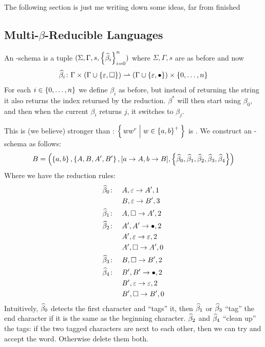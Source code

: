 \documentclass{llncs}
\newcommand{\ari}[1]{{\begin{mdframed}[linecolor=blue]{\color{blue}#1}\end{mdframed}}}
\begin{document}
\ari{The following section is just me writing down some ideas, far from finished}

\subsection{Multi-$\beta$-Reducible Languages}

An \MBR-schema is a tuple $(\Sigma,\Gamma,s,\set{\hb_i}_{i=0}^n)$ where $\Sigma,\Gamma,s$ are as before and now
\[ \hb_i\colon\Gamma\times(\Gamma\cup\set{\epsilon,\square})\partial(\Gamma\cup\set{\epsilon,\bullet})\times\set{0,\dots,n} \]
For each $i\in\set{0,\dots,n}$ we define $\beta_i$ as before, but instead of returning the string it also returns the index returned by the reduction.
$\beta^*$ will then start using $\beta_0$, and then when the current $\beta_i$ returns $j$, it switches to $\beta_j$.

This is (we believe) stronger than \BR: $\set{ww^r}[w\in\set{a,b}^+]$ is \MBR.
We construct an \MBR-schema as follows:
\[ B = \parens{\set{a,b},\set{A,B,A',B'},[a\to A,b\to B],\set{\hb_0,\hb_1,\hb_2,\hb_3,\hb_4}} \]
Where we have the reduction rules:
\begin{align*}
    \widehat\beta_0\colon\quad& A,\varepsilon\to A',1\\
        & B,\varepsilon\to B',3\\
    \widehat\beta_1\colon\quad& A,\square\to A',2\\
    \widehat\beta_2\colon\quad& A',A'\to\bullet,2\\
        &A',\varepsilon\to\varepsilon,2\\
        &A',\square\to A',0\\
    \widehat\beta_3\colon\quad& B,\square\to B',2\\
    \widehat\beta_4\colon\quad& B',B'\to\bullet,2\\
        &B',\varepsilon\to\varepsilon,2\\
        &B',\square\to B',0\\
\end{align*}
Intuitively, $\widehat\beta_0$ detects the first character and ``tags'' it, then $\widehat\beta_1$ or $\widehat\beta_3$ ``tag'' the end character if it is the same as the beginning character.
$\widehat\beta_2$ and $\widehat\beta_4$ ``clean up'' the tags: if the two tagged characters are next to each other, then we can try and accept the word.
Otherwise delete them both.
\end{document}
